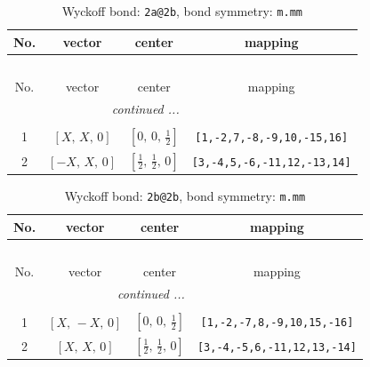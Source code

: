 \documentclass[fleqn,8pt]{jsarticle}
\begin{document}
\begin{longtable}{cccc}
\caption{Wyckoff bond: {\tt 2a@2b}, bond symmetry: {\tt m.mm}}
 \\
 \hline \hline
No. & vector & center & mapping \\ \hline \endfirsthead

\multicolumn{3}{l}{\tablename\ \thetable{}} \\
 \hline \hline
No. & vector & center & mapping \\ \hline \endhead

 \hline \hline
\multicolumn{3}{r}{\footnotesize\it continued ...} \\ \endfoot

 \hline \hline
\multicolumn{3}{r}{} \\ \endlastfoot

1 & $\left[ X,\, X,\, 0 \right]$ & $\left[ 0,\, 0,\, \frac{1}{2} \right]$ & {\tt [1,-2,7,-8,-9,10,-15,16]} \\ \hline
2 & $\left[ - X,\, X,\, 0 \right]$ & $\left[ \frac{1}{2},\, \frac{1}{2},\, 0 \right]$ & {\tt [3,-4,5,-6,-11,12,-13,14]} \\
\end{longtable}
\renewcommand{\arraystretch}{1.2}
\begin{longtable}{cccc}
\caption{Wyckoff bond: {\tt 2b@2b}, bond symmetry: {\tt m.mm}}
 \\
 \hline \hline
No. & vector & center & mapping \\ \hline \endfirsthead

\multicolumn{3}{l}{\tablename\ \thetable{}} \\
 \hline \hline
No. & vector & center & mapping \\ \hline \endhead

 \hline \hline
\multicolumn{3}{r}{\footnotesize\it continued ...} \\ \endfoot

 \hline \hline
\multicolumn{3}{r}{} \\ \endlastfoot

1 & $\left[ X,\, - X,\, 0 \right]$ & $\left[ 0,\, 0,\, \frac{1}{2} \right]$ & {\tt [1,-2,-7,8,-9,10,15,-16]} \\ \hline
2 & $\left[ X,\, X,\, 0 \right]$ & $\left[ \frac{1}{2},\, \frac{1}{2},\, 0 \right]$ & {\tt [3,-4,-5,6,-11,12,13,-14]} \\
\end{longtable}
\renewcommand{\arraystretch}{1.2}
\end{document}
